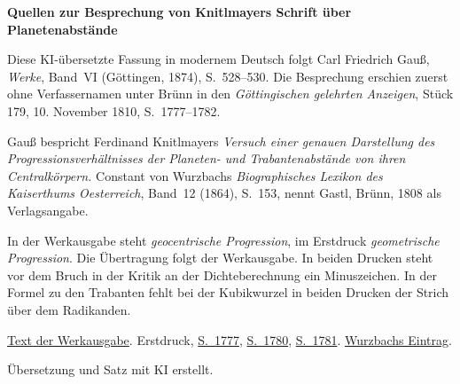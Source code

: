 \clearpage\thispagestyle{empty}
\begin{center}\textbf{Quellen zur Besprechung von Knitlmayers Schrift über Planetenabstände}\end{center}
\noindent Diese KI-übersetzte Fassung in modernem Deutsch folgt Carl Friedrich Gauß, \textit{Werke}, Band~VI (Göttingen, 1874), S.~528--530. Die Besprechung erschien zuerst ohne Verfassernamen unter Brünn in den \textit{Göttingischen gelehrten Anzeigen}, Stück 179, 10. November 1810, S.~1777--1782.
\par\smallskip\noindent Gauß bespricht Ferdinand Knitlmayers \textit{Versuch einer genauen Darstellung des Progressionsverhältnisses der Planeten- und Trabantenabstände von ihren Centralkörpern.} Constant von Wurzbachs \textit{Biographisches Lexikon des Kaiserthums Oesterreich}, Band~12 (1864), S.~153, nennt Gastl, Brünn, 1808 als Verlagsangabe.
\par\smallskip\noindent In der Werkausgabe steht \emph{geocentrische Progression}, im Erstdruck \emph{geometrische Progression}. Die Übertragung folgt der Werkausgabe. In beiden Drucken steht vor dem Bruch in der Kritik an der Dichteberechnung ein Minuszeichen. In der Formel zu den Trabanten fehlt bei der Kubikwurzel in beiden Drucken der Strich über dem Radikanden.
\par\smallskip\noindent \href{https://gdz.sub.uni-goettingen.de/id/PPN236007467}{Text der Werkausgabe}. Erstdruck, \href{https://images.p.sub.uni-goettingen.de/iiif/image/gdz:PPN319721507_1810:00001811/full/1650,/0/default.jpg}{S.~1777}, \href{https://images.p.sub.uni-goettingen.de/iiif/image/gdz:PPN319721507_1810:00001814/full/1650,/0/default.jpg}{S.~1780}, \href{https://images.p.sub.uni-goettingen.de/iiif/image/gdz:PPN319721507_1810:00001815/full/1650,/0/default.jpg}{S.~1781}. \href{https://repository.uibk.ac.at/filestore/servlet/GetFile?id=CHFZTKXMVZVIMCGAEKCS&convert=image/jpg&scale=3.33}{Wurzbachs Eintrag}.
\par\smallskip\noindent Übersetzung und Satz mit KI erstellt.
\clearpage
